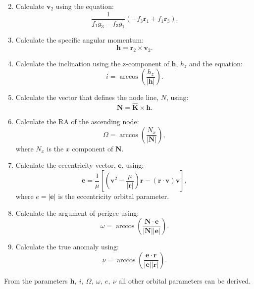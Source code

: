 \documentclass[10pt, twocolumn]{revtex4}    %
\begin{document}
\begin{enumerate}
\begin{equation}
 \end{equation}
 \item Calculate $\mathbf{v}_2$ using the equation:
 \begin{equation}
 \frac{1}{f_1g_3-f_3g_1}(-f_3\mathbf{r}_1+f_1\mathbf{r}_3) .
 \end{equation}
 \item Calculate the specific angular momentum:
 \begin{equation}
 \mathbf{h} = \mathbf{r}_2 \times \mathbf{v}_2 .
 \end{equation} 
 \item Calculate the inclination using the z-component of $\mathbf{h}$, $h_z$ and the equation:
 \begin{equation}
 i = \arccos\left( \frac{h_z}{|\mathbf{h}|} \right) .
 \end{equation}
 \item Calculate the vector that defines the node line, $N$, using:
 \begin{equation}
 \mathbf{N} = \mathbf{\hat{K}} \times \mathbf{h} .
 \end{equation} 
 \item Calculate the RA of the ascending node:
 \begin{equation}
 \Omega = \arccos \left( \frac{N_x}{|\mathbf{N}|} \right) ,
 \end{equation}
 where $N_x$ is the $x$ component of $\mathbf{N}$.
 \item Calculate the eccentricity vector, $\mathbf{e}$, using:
 \begin{equation}
 \mathbf{e} = \frac{1}{\mu} \left[ \left(\mathbf{v}^2 - \frac{\mu}{|\mathbf{r}|} \right) \mathbf{r} - (\mathbf{r}\cdot\mathbf{v}) \mathbf{v} \right] ,
 \end{equation}
 where $e = |\mathbf{e}|$ is the eccentricity orbital parameter.
 \item Calculate the argument of perigee using:
 \begin{equation}
 \omega = \arccos \left( \frac{\mathbf{N} \cdot \mathbf{e}}{|\mathbf{N}||\mathbf{e}|} \right) .
 \end{equation}
 \item Calculate the true anomaly using:
 \begin{equation}
 \nu = \arccos \left( \frac{\mathbf{e} \cdot \mathbf{r}}{|\mathbf{e}||\mathbf{r}|} \right) .
 \end{equation}
\end{enumerate}
From the parameters $\mathbf{h},\ i,\ \Omega,\ \omega,\ e,\ \nu$ all other orbital parameters can be derived.
\vspace{1ex}
\end{document}

